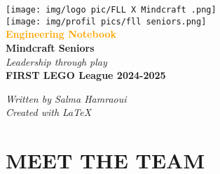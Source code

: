 \begin{titlepage}
    \centering

    \texttt{[image: img/logo pic/FLL X Mindcraft .png]} \\[0.5cm] 
    \texttt{[image: img/profil pics/fll seniors.png]} \\[1.5cm] 
    {\Huge \textbf{\textcolor{orange}{Engineering Notebook}}} \\[0.8cm]
    {\LARGE \textbf{Mindcraft Seniors}}\\[0.8cm]
    {\Large \textit{Leadership through play}} \\[0.8cm]
    {\large \textbf{FIRST LEGO League 2024-2025}} \\

    \vfill 
\end{titlepage}
\vfill
\begin{flushright}
    \textit{Written by Salma Hamraoui} \\
    \textit{Created with \LaTeX}
\end{flushright}

\setcounter{page}{1}
\tableofcontents

\newpage
\listoffigures
\nopagebreak
\noindent\begin{minipage}{\textwidth}
\listoftables
\end{minipage}
\newpage

\section{MEET THE TEAM}

\vspace{1cm}

